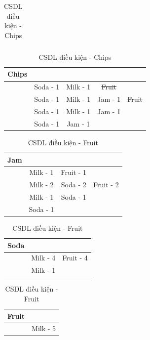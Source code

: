 \documentclass{article}
\begin{document}
\begin{flushleft}
\begin{table}[H]
\begin{minipage}[t]{0.5\linewidth}
\begin{tabular}{| c | c | c | c | c |}
		\end{tabular}
	\end{minipage}%
	\begin{minipage}[t]{0.5\linewidth}
		\centering
		\caption{CSDL điều kiện - Chips}
		\begin{tabular}{| c | c | c | c | c |}
			\hline
			Chips &&&& \\ \hline
			&Soda - 1 & Milk - 1 & \st{Fruit} &\\ \hline
			&Soda - 1 & Milk - 1 & Jam - 1 & \st{Fruit} \\ \hline
			&Soda - 1 & Milk - 1 & Jam - 1 & \\ \hline
			&Soda - 1 & Jam - 1 && \\ \hline
		\end{tabular}
	\end{minipage}
\end{table}
\begin{table}[H]
	\begin{minipage}[t]{0.4\linewidth}
		\centering
		\caption{CSDL điều kiện - Jam}
		\begin{tabular}{| c | c | c | c |}
			\hline
			Jam &&& \\ \hline
			&Milk - 1 & Fruit - 1 & \\ \hline
			&Milk - 2 & Soda - 2 & Fruit - 2  \\ \hline
			&Milk - 1 & Soda - 1 &  \\ \hline
			&Soda - 1 & & \\ \hline
		\end{tabular}
	\end{minipage}%
	\begin{minipage}[t]{0.35\linewidth}
		\centering
		\caption{CSDL điều kiện - Soda}
		\begin{tabular}{| c | c | c |}
			\hline
			Soda && \\ \hline
			&Milk - 4 & Fruit - 4  \\ \hline
			&Milk - 1 &  \\ \hline
		\end{tabular}
	\end{minipage}%
	\begin{minipage}[t]{0.3\linewidth}
		\centering
		\caption{CSDL điều kiện - Fruit}
		\begin{tabular}{| c | c |}
			\hline
			Fruit & \\ \hline
			&Milk - 5   \\ \hline
		\end{tabular}
	\end{minipage}%


\end{table}
\end{flushleft}
\end{document}
